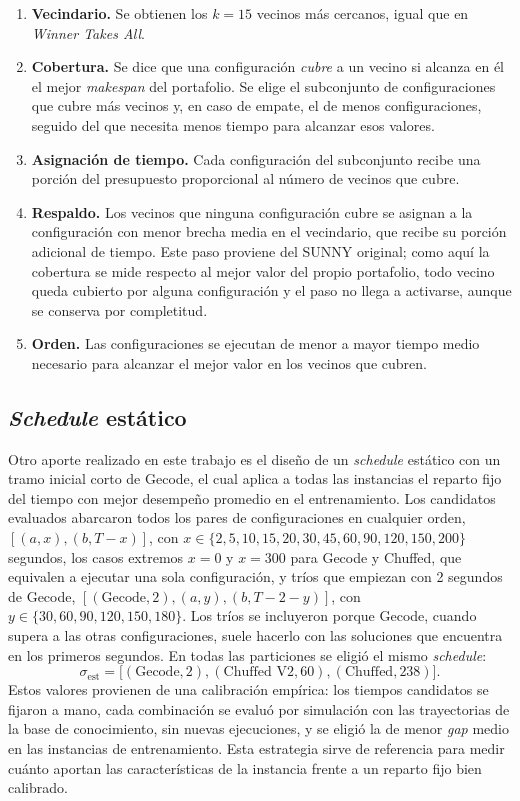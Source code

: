 \begin{enumerate}
  \item \textbf{Vecindario.} Se obtienen los $k = 15$ vecinos más cercanos,
    igual que en \textit{Winner Takes All}.
  \item \textbf{Cobertura.} Se dice que una configuración \textit{cubre} a un
    vecino si alcanza en él el mejor \textit{makespan} del portafolio. Se
    elige el subconjunto de configuraciones que cubre más vecinos y, en caso de
    empate, el de menos configuraciones, seguido del que necesita menos tiempo
    para alcanzar esos valores.
  \item \textbf{Asignación de tiempo.} Cada configuración del subconjunto
    recibe una porción del presupuesto proporcional al número de vecinos que
    cubre.
  \item \textbf{Respaldo.} Los vecinos que ninguna configuración cubre se
    asignan a la configuración con menor brecha media en el vecindario, que
    recibe su porción adicional de tiempo. Este paso proviene del SUNNY
    original; como aquí la cobertura se mide respecto al mejor valor del
    propio portafolio, todo vecino queda cubierto por alguna configuración y
    el paso no llega a activarse, aunque se conserva por completitud.
  \item \textbf{Orden.} Las configuraciones se ejecutan de menor a mayor
    tiempo medio necesario para alcanzar el mejor valor en los vecinos que
    cubren.
\end{enumerate}

\subsection{\textit{Schedule} estático}
\label{sec:schedule_estatico}
Otro aporte realizado en este trabajo es el diseño de un \textit{schedule}
estático con un tramo inicial corto de Gecode, el cual aplica a todas las
instancias el reparto fijo del tiempo con mejor desempeño promedio en el
entrenamiento. Los candidatos evaluados abarcaron todos los pares de
configuraciones en cualquier orden, $[(a, x), (b, T - x)]$, con
$x \in \{2, 5, 10, 15, 20, 30, 45, 60, 90, 120, 150, 200\}$ segundos, los
casos extremos $x = 0$ y $x = 300$ para Gecode y Chuffed, que equivalen a
ejecutar una sola configuración, y tríos que empiezan con 2 segundos de
Gecode, $[(\text{Gecode}, 2), (a, y), (b, T - 2 - y)]$, con
$y \in \{30, 60, 90, 120, 150, 180\}$. Los tríos se incluyeron porque Gecode,
cuando supera a las otras configuraciones, suele hacerlo con las soluciones
que encuentra en los primeros segundos. En todas las particiones se eligió el
mismo \textit{schedule}:
\[
  \sigma_{\mathrm{est}} = \bigl[ (\text{Gecode}, 2), (\text{Chuffed V2}, 60),
  (\text{Chuffed}, 238) \bigr].
\]
Estos valores provienen de una calibración empírica: los tiempos candidatos
se fijaron a mano, cada combinación se evaluó por simulación con las
trayectorias de la base de conocimiento, sin nuevas ejecuciones, y se eligió
la de menor \textit{gap} medio en las instancias de entrenamiento.
Esta estrategia sirve de referencia para medir cuánto aportan las
características de la instancia frente a un reparto fijo bien calibrado.

